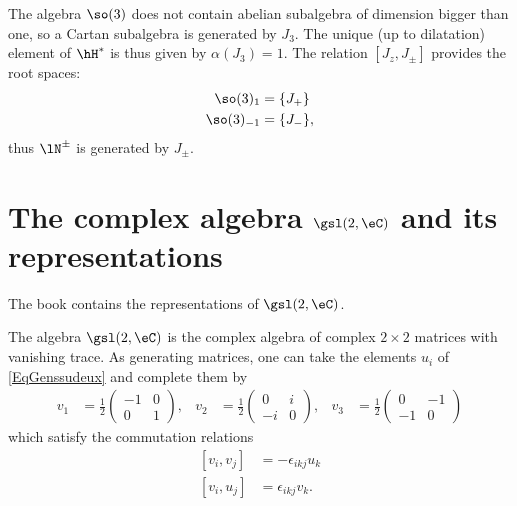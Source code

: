 The algebra $\so(3)$ does not contain abelian subalgebra of dimension bigger than one, so a Cartan subalgebra is generated by $J_3$. The unique (up to dilatation) element of $\hH^*$ is thus given by $\alpha(J_3)=1$. The relation $[J_z,J_{\pm}]$ provides the root spaces:
\begin{equation}
    \begin{aligned}
        \so(3)_1    &=\{ J_+ \}\\
        \so(3)_{-1} &=\{ J_- \},
    \end{aligned}
\end{equation}
thus $\lN^{\pm}$ is generated by $J_{\pm}$.

                    \section{The complex algebra \texorpdfstring{$\protect\gsl(2,\eC)$}{sl2C} and its representations}
\label{SecsldeuxCandrepres}

The book \cite{Kassel} contains the representations of \( \gsl(2,\eC)\).

The algebra $\gsl(2,\eC)$ is the complex algebra of complex $2\times 2$ matrices with vanishing trace. As generating matrices, one can take the elements $u_i$ of \eqref{EqGenssudeux} and complete them by
\begin{align*}
v_1&=\frac{ 1 }{2}
\begin{pmatrix}
  -1    &   0   \\ 
  0 &   1   
\end{pmatrix},
&v_2&=\frac{ 1 }{2}
\begin{pmatrix}
  0 &   i   \\ 
  -i    &   0   
\end{pmatrix},
&v_3&=\frac{ 1 }{2}
\begin{pmatrix}
  0 &   -1  \\ 
  -1    &   0   
\end{pmatrix}
\end{align*}
which satisfy the commutation relations
\begin{subequations}
\begin{align}
    [v_i,v_j]&=-\epsilon_{ikj}u_k\\
    [v_i,u_j]&=\epsilon_{ikj}v_k.
\end{align}
\end{subequations}

